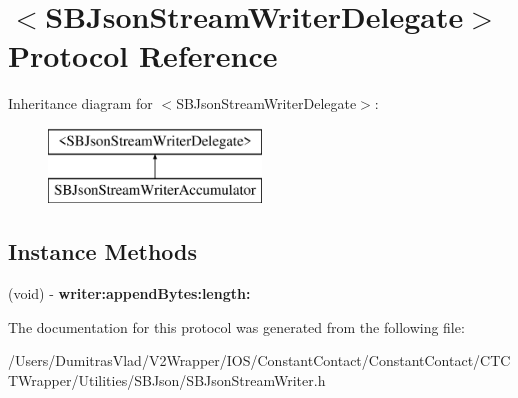 \hypertarget{protocol_s_b_json_stream_writer_delegate-p}{\section{$<$S\-B\-Json\-Stream\-Writer\-Delegate$>$ Protocol Reference}
\label{protocol_s_b_json_stream_writer_delegate-p}
}
Inheritance diagram for $<$S\-B\-Json\-Stream\-Writer\-Delegate$>$\-:\begin{figure}[H]
\begin{center}
\leavevmode
\includegraphics[height=2.000000cm]{protocol_s_b_json_stream_writer_delegate-p}
\end{center}
\end{figure}
\subsection*{Instance Methods}
\begin{DoxyCompactItemize}
\item 
\hypertarget{protocol_s_b_json_stream_writer_delegate-p_a969263873e164a2c1032fb26ff92faac}{(void) -\/ {\bfseries writer\-:append\-Bytes\-:length\-:}}\label{protocol_s_b_json_stream_writer_delegate-p_a969263873e164a2c1032fb26ff92faac}

\end{DoxyCompactItemize}


The documentation for this protocol was generated from the following file\-:\begin{DoxyCompactItemize}
\item 
/\-Users/\-Dumitras\-Vlad/\-V2\-Wrapper/\-I\-O\-S/\-Constant\-Contact/\-Constant\-Contact/\-C\-T\-C\-T\-Wrapper/\-Utilities/\-S\-B\-Json/S\-B\-Json\-Stream\-Writer.\-h\end{DoxyCompactItemize}

